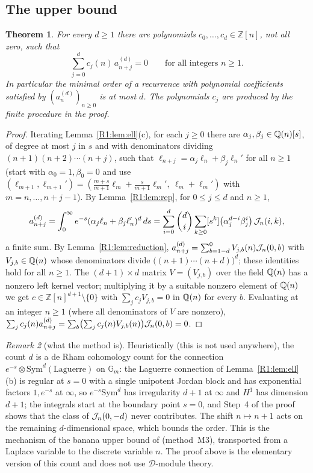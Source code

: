 \documentclass[11pt]{amsart}
\newtheorem{theorem}{Theorem}[section]
\theoremstyle{definition}
\theoremstyle{remark}
\newtheorem{remark}[theorem]{Remark}
\begin{document}
\subsection{The upper bound}\label{R1:sec:upper}

\begin{theorem}\label{R1:thm:upper}
For every $d\ge1$ there are polynomials $c_0,\dots,c_d\in\mathbb{Z}[n]$, not all zero, such
that
\[
\sum_{j=0}^{d}c_j(n)\,a^{(d)}_{n+j}=0\qquad\text{for all integers }n\ge1 .
\]
In particular the minimal order of a recurrence with polynomial coefficients satisfied by
$(a^{(d)}_n)_{n\ge0}$ is at most $d$. The polynomials $c_j$ are produced by the finite
procedure in the proof.
\end{theorem}

\begin{proof}
Iterating Lemma~\ref{R1:lem:ell}(c), for each $j\ge0$ there are $\alpha_j,\beta_j\in
\mathbb{Q}(n)[s]$, of degree at most $j$ in $s$ and with denominators dividing
$(n+1)(n+2)\cdots(n+j)$, such that $\ell_{n+j}=\alpha_j\ell_n+\beta_j\ell_n'$ for all $n\ge1$
(start with $\alpha_0=1,\beta_0=0$ and use
$(\ell_{m+1},\ell_{m+1}')=(\frac{m+s}{m+1}\ell_m+\frac{s}{m+1}\ell_m',\ \ell_m+\ell_m')$ with
$m=n,\dots,n+j-1$). By Lemma~\ref{R1:lem:rep}, for $0\le j\le d$ and $n\ge1$,
\[
a^{(d)}_{n+j}=\int_0^\infty e^{-s}(\alpha_j\ell_n+\beta_j\ell_n')^d\,ds
=\sum_{i=0}^{d}\binom{d}{i}\sum_{k\ge0}[s^k]\bigl(\alpha_j^{d-i}\beta_j^{i}\bigr)\,\mathcal{J}_n(i,k),
\]
a finite sum. By Lemma~\ref{R1:lem:reduction},
$a^{(d)}_{n+j}=\sum_{b=1-d}^{0}V_{j,b}(n)\mathcal{J}_n(0,b)$ with $V_{j,b}\in\mathbb{Q}(n)$ whose
denominators divide $\bigl((n+1)\cdots(n+d)\bigr)^d$; these identities hold for all $n\ge1$.
The $(d+1)\times d$ matrix $V=(V_{j,b})$ over the field $\mathbb{Q}(n)$ has a nonzero left kernel
vector; multiplying it by a suitable nonzero element of $\mathbb{Q}(n)$ we get
$c\in\mathbb{Z}[n]^{d+1}\setminus\{0\}$ with $\sum_jc_jV_{j,b}=0$ in $\mathbb{Q}(n)$ for every $b$.
Evaluating at an integer $n\ge1$ (where all denominators of $V$ are nonzero),
$\sum_jc_j(n)a^{(d)}_{n+j}=\sum_b\bigl(\sum_jc_j(n)V_{j,b}(n)\bigr)\mathcal{J}_n(0,b)=0$.
\end{proof}

\begin{remark}[what the method is]\label{R1:rem:method}
Heuristically (this is not used anywhere), the count $d$ is a de Rham cohomology count for
the connection $e^{-s}\otimes\mathrm{Sym}^d(\text{Laguerre})$ on $\mathbb{G}_m$: the Laguerre
connection of Lemma~\ref{R1:lem:ell}(b) is regular at $s=0$ with a single unipotent Jordan
block and has exponential factors $1,e^{-s}$ at $\infty$, so $e^{-s}\mathrm{Sym}^d$ has
irregularity $d+1$ at $\infty$ and $H^1$ has dimension $d+1$; the integrals start at the
boundary point $s=0$, and Step~4 of the proof shows that the class of $\mathcal{J}_n(0,-d)$ never
contributes. The shift $n\mapsto n+1$ acts on the remaining $d$-dimensional space, which
bounds the order. This is the
mechanism of the banana upper bound of \cite{K-032} (method~M3), transported from a Laplace variable
to the discrete variable $n$. The proof above is the elementary version of this count and
does not use $\mathcal D$-module theory.
\end{remark}
\end{document}
